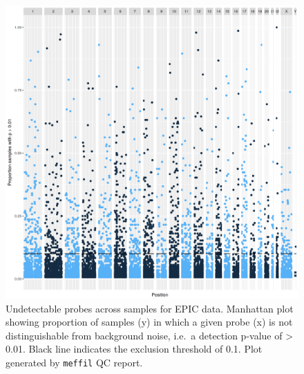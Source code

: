 \documentclass[
]{book}
\begin{document}
\begin{figure}

{\centering \includegraphics[width=0.8\linewidth]{figs/MAVIDOSqcEPICpropSamples} 

}

\caption{Undetectable probes across samples for EPIC data. Manhattan plot showing proportion of samples (y) in which a given probe (x) is not distinguishable from background noise, i.e.~a detection p-value of \textgreater{} 0.01. Black line indicates the exclusion threshold of 0.1. Plot generated by \texttt{meffil} QC report.}\label{fig:MAVIDOSqcEPICpropSamples}
\end{figure}
\end{document}
